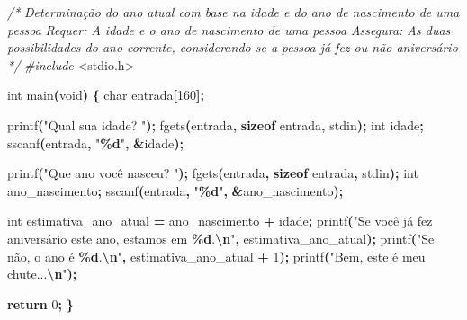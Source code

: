 \documentclass[
  11pt,
  a4paper,
]{scrbook}
\newenvironment{Shaded}{\begin{snugshade}}{\end{snugshade}}
\newcommand{\CommentTok}[1]{\textcolor[rgb]{0.56,0.35,0.01}{\textit{#1}}}
\newcommand{\ControlFlowTok}[1]{\textcolor[rgb]{0.13,0.29,0.53}{\textbf{#1}}}
\newcommand{\DataTypeTok}[1]{\textcolor[rgb]{0.13,0.29,0.53}{#1}}
\newcommand{\DecValTok}[1]{\textcolor[rgb]{0.00,0.00,0.81}{#1}}
\newcommand{\ImportTok}[1]{#1}
\newcommand{\KeywordTok}[1]{\textcolor[rgb]{0.13,0.29,0.53}{\textbf{#1}}}
\newcommand{\NormalTok}[1]{#1}
\newcommand{\OperatorTok}[1]{\textcolor[rgb]{0.81,0.36,0.00}{\textbf{#1}}}
\newcommand{\PreprocessorTok}[1]{\textcolor[rgb]{0.56,0.35,0.01}{\textit{#1}}}
\newcommand{\SpecialCharTok}[1]{\textcolor[rgb]{0.81,0.36,0.00}{\textbf{#1}}}
\newcommand{\StringTok}[1]{\textcolor[rgb]{0.31,0.60,0.02}{#1}}
\begin{document}
\begin{Shaded}
\begin{Highlighting}[]
\CommentTok{/*}
\CommentTok{Determinação do ano atual com base na idade e do ano de nascimento de uma}
\CommentTok{    pessoa}
\CommentTok{Requer: A idade e o ano de nascimento de uma pessoa}
\CommentTok{Assegura: As duas possibilidades do ano corrente, considerando se a}
\CommentTok{    pessoa já fez ou não aniversário}
\CommentTok{*/}
\PreprocessorTok{\#include }\ImportTok{\textless{}stdio.h\textgreater{}}

\DataTypeTok{int}\NormalTok{ main}\OperatorTok{(}\DataTypeTok{void}\OperatorTok{)} \OperatorTok{\{}
    \DataTypeTok{char}\NormalTok{ entrada}\OperatorTok{[}\DecValTok{160}\OperatorTok{];}

\NormalTok{    printf}\OperatorTok{(}\StringTok{"Qual sua idade? "}\OperatorTok{);}
\NormalTok{    fgets}\OperatorTok{(}\NormalTok{entrada}\OperatorTok{,} \KeywordTok{sizeof}\NormalTok{ entrada}\OperatorTok{,}\NormalTok{ stdin}\OperatorTok{);}
    \DataTypeTok{int}\NormalTok{ idade}\OperatorTok{;}
\NormalTok{    sscanf}\OperatorTok{(}\NormalTok{entrada}\OperatorTok{,} \StringTok{"}\SpecialCharTok{\%d}\StringTok{"}\OperatorTok{,} \OperatorTok{\&}\NormalTok{idade}\OperatorTok{);}

\NormalTok{    printf}\OperatorTok{(}\StringTok{"Que ano você nasceu? "}\OperatorTok{);}
\NormalTok{    fgets}\OperatorTok{(}\NormalTok{entrada}\OperatorTok{,} \KeywordTok{sizeof}\NormalTok{ entrada}\OperatorTok{,}\NormalTok{ stdin}\OperatorTok{);}
    \DataTypeTok{int}\NormalTok{ ano\_nascimento}\OperatorTok{;}
\NormalTok{    sscanf}\OperatorTok{(}\NormalTok{entrada}\OperatorTok{,} \StringTok{"}\SpecialCharTok{\%d}\StringTok{"}\OperatorTok{,} \OperatorTok{\&}\NormalTok{ano\_nascimento}\OperatorTok{);}

    \DataTypeTok{int}\NormalTok{ estimativa\_ano\_atual }\OperatorTok{=}\NormalTok{ ano\_nascimento }\OperatorTok{+}\NormalTok{ idade}\OperatorTok{;}
\NormalTok{    printf}\OperatorTok{(}\StringTok{"Se você já fez aniversário este ano, estamos em }\SpecialCharTok{\%d}\StringTok{.}\SpecialCharTok{\textbackslash{}n}\StringTok{"}\OperatorTok{,}
\NormalTok{        estimativa\_ano\_atual}\OperatorTok{);}
\NormalTok{    printf}\OperatorTok{(}\StringTok{"Se não, o ano é }\SpecialCharTok{\%d}\StringTok{.}\SpecialCharTok{\textbackslash{}n}\StringTok{"}\OperatorTok{,}\NormalTok{ estimativa\_ano\_atual }\OperatorTok{+} \DecValTok{1}\OperatorTok{);}
\NormalTok{    printf}\OperatorTok{(}\StringTok{"Bem, este é meu chute...}\SpecialCharTok{\textbackslash{}n}\StringTok{"}\OperatorTok{);}

    \ControlFlowTok{return} \DecValTok{0}\OperatorTok{;}
\OperatorTok{\}}
\end{Highlighting}
\end{Shaded}
\end{document}
